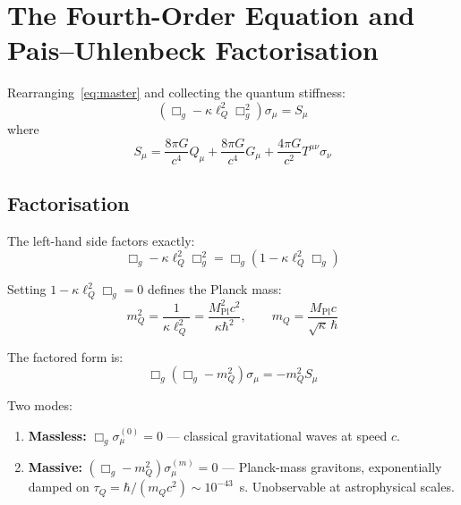 \documentclass[11pt,a4paper]{article}
\theoremstyle{plain}
\theoremstyle{definition}
\theoremstyle{remark}
\newcommand{\lQ}{\ell_Q}
\newcommand{\mQ}{m_Q}
\newcommand{\Mpl}{M_{\mathrm{Pl}}}
\begin{document}
\section{The Fourth-Order Equation and Pais--Uhlenbeck Factorisation}
\label{sec:PU}

Rearranging~\eqref{eq:master} and collecting the quantum stiffness:
\begin{equation}
  \boxed{(\Box_g - \kappa\lQ^2\Box_g^2)\sigma_\mu = S_\mu}
  \label{eq:fourth}
\end{equation}
where
\begin{equation}
  S_\mu = \frac{8\pi G}{c^4}Q_\mu + \frac{8\pi G}{c^4}G_\mu + \frac{4\pi G}{c^2}T^{\mu\nu}\sigma_\nu
\end{equation}

\subsection{Factorisation}

The left-hand side factors exactly:
\begin{equation}
  \Box_g - \kappa\lQ^2\Box_g^2 = \Box_g(1 - \kappa\lQ^2\Box_g)
\end{equation}

Setting $1 - \kappa\lQ^2\Box_g = 0$ defines the Planck mass:
\begin{equation}
  \mQ^2 = \frac{1}{\kappa\lQ^2} = \frac{\Mpl^2 c^2}{\kappa\hbar^2}, \qquad \mQ = \frac{\Mpl c}{\sqrt{\kappa}\,\hbar}
\end{equation}

The factored form is:
\begin{equation}
  \boxed{\Box_g(\Box_g - \mQ^2)\sigma_\mu = -\mQ^2 S_\mu}
  \label{eq:PU}
\end{equation}

Two modes:
\begin{enumerate}
  \item \textbf{Massless:} $\Box_g\sigma_\mu^{(0)} = 0$ --- classical gravitational waves at speed $c$.
  \item \textbf{Massive:} $(\Box_g - \mQ^2)\sigma_\mu^{(m)} = 0$ --- Planck-mass gravitons, exponentially damped on $\tau_Q = \hbar/(\mQ c^2) \sim 10^{-43}$~s.  Unobservable at astrophysical scales.
\end{enumerate}

\end{document}
